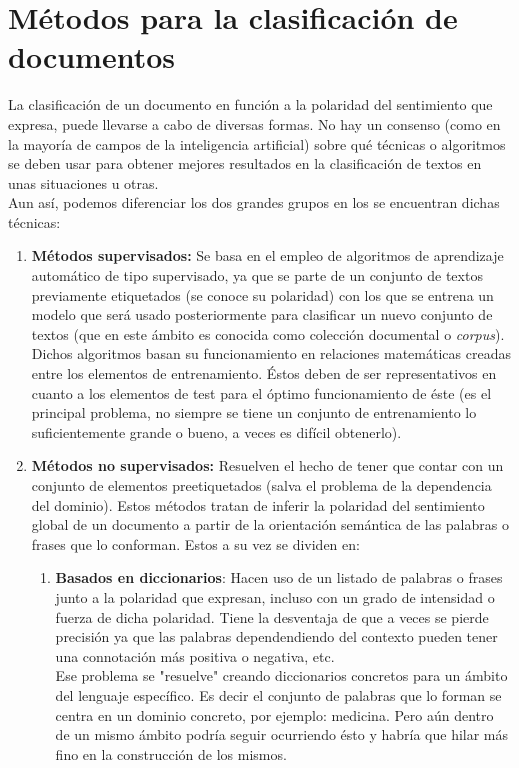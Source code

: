 \documentclass[a4paper,12pt]{report}
\begin{document}
\section{Métodos para la clasificación de documentos}

{\setlength{\parindent}{0cm}
La clasificación de un documento en función a la polaridad del sentimiento que expresa, puede llevarse a cabo de diversas formas. No hay un consenso (como en la mayoría de campos de la inteligencia artificial) sobre qué técnicas o algoritmos se deben usar para obtener mejores resultados en la clasificación de textos en unas situaciones u otras. }
\vspace{2mm}\\
Aun así, podemos diferenciar los dos grandes grupos en los se encuentran dichas técnicas:

\begin{enumerate}

\item \textbf{Métodos supervisados:} Se basa en el empleo de algoritmos de aprendizaje automático de tipo supervisado, ya que se parte de un conjunto de textos previamente etiquetados (se conoce su polaridad) con los que se entrena un modelo que será usado posteriormente para clasificar un nuevo conjunto de textos (que en este ámbito es conocida como colección documental o \textit{corpus}). 
\vspace{2mm}\\
Dichos algoritmos basan su funcionamiento en relaciones matemáticas creadas entre los elementos de entrenamiento. Éstos deben de ser representativos en cuanto a los elementos de test para el óptimo funcionamiento de éste (es el principal problema, no siempre se tiene un conjunto de entrenamiento lo suficientemente grande o bueno, a veces es difícil obtenerlo).


\item \textbf{Métodos no supervisados:} Resuelven el hecho de tener que contar con un conjunto de elementos preetiquetados (salva el problema de la dependencia del dominio). Estos métodos tratan de inferir la polaridad del sentimiento global de un documento a partir de la orientación semántica de las palabras o frases que lo conforman. Estos a su vez se dividen en: 

	\begin{enumerate}

	\item \textbf{Basados en diccionarios}: Hacen uso de un listado de palabras o frases junto a la polaridad que expresan, incluso con un grado de intensidad o fuerza de dicha polaridad. Tiene la desventaja de que a veces se pierde precisión ya que las palabras dependendiendo del contexto pueden tener una connotación más positiva o negativa, etc.
	\vspace{2mm}\\
	Ese problema se "resuelve" creando diccionarios concretos para un ámbito del lenguaje específico. Es decir el conjunto de palabras que lo forman se centra en un dominio concreto, por ejemplo: medicina. Pero aún dentro de un mismo ámbito podría seguir ocurriendo ésto y habría que hilar más fino en la construcción de los mismos.
	

\end{enumerate}
\end{enumerate}
\end{document}
